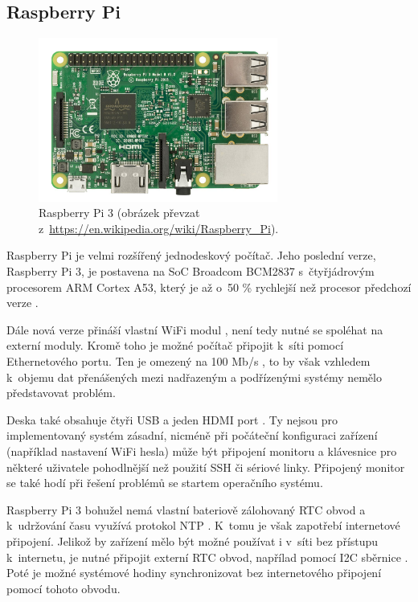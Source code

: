 \subsection{Raspberry Pi}
\label{sec:an_rpi}

\begin{figure}[h!]
    \centering
    \includegraphics[width=0.7\textwidth]{images/rpi.jpg}
    \caption[Raspberry Pi 3]{Raspberry Pi 3 (obrázek převzat z~\url{https://en.wikipedia.org/wiki/Raspberry_Pi}).}
    \label{fig:rpi}
\end{figure}

Raspberry Pi je velmi rozšířený jednodeskový počítač. Jeho poslední verze, Raspberry Pi 3, je postavena na SoC Broadcom BCM2837 s~čtyřjádrovým procesorem ARM Cortex A53, který je až o~50 \% rychlejší než procesor předchozí verze \cite{rpi_benchoff}.

Dále nová verze přináší vlastní WiFi modul \cite{rpi_benchoff}, není tedy nutné se spoléhat na externí moduly. Kromě toho je možné počítač připojit k~síti pomocí Ethernetového portu. Ten je omezený na 100 Mb/s \cite{rpi_benchoff}, to by však vzhledem k~objemu dat přenášených mezi nadřazeným a podřízenými systémy nemělo představovat problém.

Deska také obsahuje čtyři USB a jeden HDMI port \cite{rpi_benchoff}. Ty nejsou pro implementovaný systém zásadní, nicméně při počáteční konfiguraci zařízení (například nastavení WiFi hesla) může být připojení monitoru a klávesnice pro některé uživatele pohodlnější než použití SSH či sériové linky. Připojený monitor se také hodí při řešení problémů se startem operačního systému.

Raspberry Pi 3 bohužel nemá vlastní bateriově zálohovaný RTC obvod a k~udržování času využívá protokol NTP \cite{rpi_rtc_ada}. K~tomu je však zapotřebí internetové připojení. Jelikož by zařízení mělo být možné používat i v~síti bez přístupu k~internetu, je nutné připojit externí RTC obvod, napřílad pomocí I2C sběrnice \cite{rpi_rtc_ada}. Poté je možné systémové hodiny synchronizovat bez internetového připojení pomocí tohoto obvodu.

